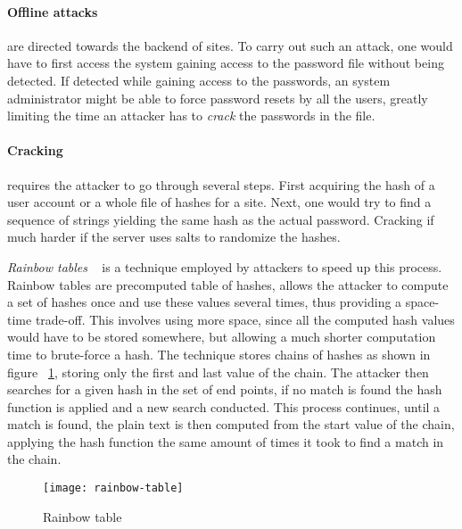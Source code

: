 \paragraph{Offline attacks} are directed towards the backend of sites. To carry out such an attack, one would have to first access the system gaining access to the password file without being detected. If detected while gaining access to the passwords, an system administrator might be able to force password resets by all the users, greatly limiting the time an attacker has to \emph{crack} the passwords in the file.

\paragraph{Cracking} requires the attacker to go through several steps. First acquiring the hash of a user account or a whole file of hashes for a site. Next, one would try to find a sequence of strings yielding the same hash as the actual password. Cracking if much harder if the server uses salts to randomize the hashes.
\par \emph{ Rainbow tables }~\cite{rainbow-tables} is a technique employed by attackers to speed up this process. Rainbow tables are precomputed table of hashes, allows the attacker to compute a set of hashes once and use these values several times, thus providing a space-time trade-off. This involves using more space, since all the computed hash values would have to be stored somewhere, but allowing a much shorter computation time to brute-force a hash. The technique stores chains of hashes as shown in figure ~\ref{rainbow-table}, storing only the first and last value of the chain. The attacker then searches for a given hash in the set of end points, if no match is found the hash function is applied and a new search conducted. This process continues, until a match is found, the plain text is then computed from the start value of the chain, applying the hash function the same amount of times it took to find a match in the chain. 

\begin{figure}[ht]
    \texttt{[image: rainbow-table]}
    \caption{Rainbow table}
    \label{rainbow-table}
\end{figure}


